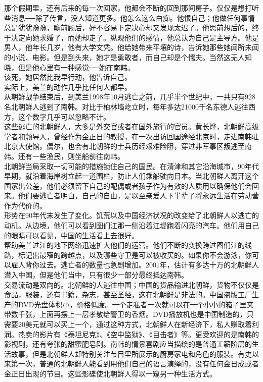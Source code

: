 那个假期里，还有后来的每一次回家，他都会不断的回到那间房子。仅仅是想打听些消息──除了传言，没人知道更多。他怎么这么白痴。他恨自己；他做任何事情总是犹犹豫豫，瞻前顾后，好不容易下定决心却又发现太迟了。他思前想后的，终于决定向她求婚了，而她却走了。纵观他们的感情，他总认为自己是主导方。他是男人，他年长几岁，他有大学文凭。他给她带来平壤的诗，告诉她那些她闻所未闻的小说、电影。但是到头来，她才是勇敢者，而自己却是个懦夫。当然这无人知晓，但是他心里有一种感觉──她在南韩。\\

该死，她居然比我早行动，他告诉自己。\\

实际上，美兰的动作几乎比任何人都早。\\

从朝鲜战争结束后，到美兰1998年10月逃亡之前，几乎半个世纪中，一共只有928名北朝鲜人逃到了南韩。对比于柏林墙屹立时，每年多达21000千名东德人逃往西方，这个数字几乎可以忽略不计。\\

这些逃亡的北朝鲜人，大多是外交官或者在国外旅行的官员。黄长烨，北朝鲜高级学者和领导人，曾经作为金正日的教授，在一次出访回国途经北京时，走进南韩驻北京大使馆。偶尔，也会有北朝鲜的士兵历经艰难险阻，穿过非军事区叛逃至南韩。还有一些渔民，则坐船前往南韩。\\

北朝鲜当局采取一切可能的措施锁住自己的国民。在清津和其它沿海城市，90年代早期，就沿着海岸树立起一道围栏，防止人们乘船驶向日本。当北朝鲜人离开这个国家出公差，他们必须留下自己的配偶或者孩子作为有效的人质用以确保他们会回来。他们要逃亡者明白，自己的自由，是以至亲爱人下半辈子将永远生活在劳动营作为代价的。\\

形势在90年代末发生了变化。饥荒以及中国经济状况的改变给了北朝鲜人以逃亡的动机。从边境，他们可以看到图们江那一侧沿着江堤跑着闪亮的汽车。他们用自己的眼睛可以看见，中国的生活看上去很好。\\

帮助美兰过江的地下网络迅速扩大他们的运营。他们不断的变换跨过图们江的线路，标记出最窄的跨越点，以及哪些守卫是可以被收买的。如果你不会游泳，你可以雇人背你过去。逃亡者的数量也急剧增加。2001年，估计有多达十万的北朝鲜人潜入中国，但是他们当中，只有很少一部分最终抵达南韩。\\

交易流动是双向的。北朝鲜的人逃往中国；中国的货品输进北朝鲜，货物不仅仅是食品，服装，还有书籍，杂志，甚至圣经，这在北朝鲜是非法的。中国盗版工厂生产的DVD光盘体积小，价格低廉。一个走私者一次就可以在一个小小的箱子里夹带数千张，上面再摆上一层孝敬给警卫的香烟。DVD播放机也是中国制造的，只需要20美元就可以买上一个，通过这种方式，北朝鲜人在新经济下，私人赚取着利润。热卖的影片有《泰坦尼克》、《空中监狱》、《目击者》等。更受欢迎的是南韩的影视剧，还有夸张的甜蜜肥皂剧。南韩的情景喜剧应当描绘的是普通工薪阶层的生活故事，但是北朝鲜人却特别关注节目里所展示的厨房家电和角色的服装。有史以来第一次，普通的北朝鲜人能看到用他们自己的语言演绎的，没有任何金日成或者金正日出现的节目。这些影碟使北朝鲜人得以一窥另一种生活方式。\\

